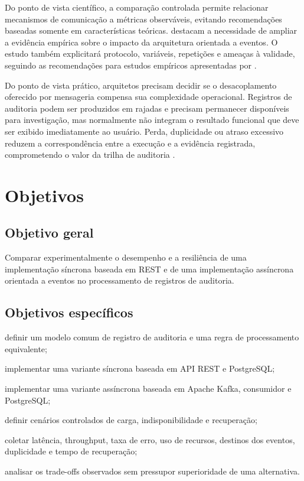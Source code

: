 Do ponto de vista científico, a comparação controlada permite relacionar mecanismos de comunicação a métricas observáveis, evitando recomendações baseadas somente em características teóricas.  destacam a necessidade de ampliar a evidência empírica sobre o impacto da arquitetura orientada a eventos. O estudo também explicitará protocolo, variáveis, repetições e ameaças à validade, seguindo as recomendações para estudos empíricos apresentadas por .

Do ponto de vista prático, arquitetos precisam decidir se o desacoplamento oferecido por mensageria compensa sua complexidade operacional. Registros de auditoria podem ser produzidos em rajadas e precisam permanecer disponíveis para investigação, mas normalmente não integram o resultado funcional que deve ser exibido imediatamente ao usuário. Perda, duplicidade ou atraso excessivo reduzem a correspondência entre a execução e a evidência registrada, comprometendo o valor da trilha de auditoria \cite{amir2016}.

\section{Objetivos}

\subsection{Objetivo geral}

Comparar experimentalmente o desempenho e a resiliência de uma implementação síncrona baseada em REST e de uma implementação assíncrona orientada a eventos no processamento de registros de auditoria.

\subsection{Objetivos específicos}

\begin{alineas}
\item definir um modelo comum de registro de auditoria e uma regra de processamento equivalente;
\item implementar uma variante síncrona baseada em API REST e PostgreSQL;
\item implementar uma variante assíncrona baseada em Apache Kafka, consumidor e PostgreSQL;
\item definir cenários controlados de carga, indisponibilidade e recuperação;
\item coletar latência, throughput, taxa de erro, uso de recursos, destinos dos eventos, duplicidade e tempo de recuperação;
\item analisar os trade-offs observados sem pressupor superioridade de uma alternativa.
\end{alineas}

